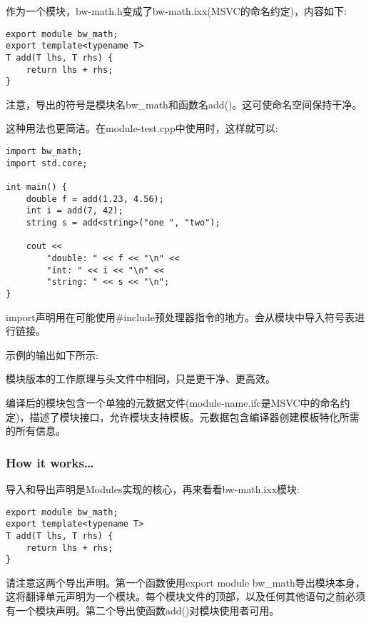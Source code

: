 作为一个模块，bw-math.h变成了bw-math.ixx(MSVC的命名约定)，内容如下:

\begin{lstlisting}[style=styleCXX]
export module bw_math;
export template<typename T>
T add(T lhs, T rhs) {
	return lhs + rhs;
}
\end{lstlisting}

注意，导出的符号是模块名bw\_math和函数名add()。这可使命名空间保持干净。

这种用法也更简洁。在module-test.cpp中使用时，这样就可以:

\begin{lstlisting}[style=styleCXX]
import bw_math;
import std.core;

int main() {
	double f = add(1.23, 4.56);
	int i = add(7, 42);
	string s = add<string>("one ", "two");
	
	cout <<
		"double: " << f << "\n" <<
		"int: " << i << "\n" <<
		"string: " << s << "\n";
}
\end{lstlisting}

import声明用在可能使用\#include预处理器指令的地方。会从模块中导入符号表进行链接。

示例的输出如下所示:


模块版本的工作原理与头文件中相同，只是更干净、更高效。

\begin{tcolorbox}[colback=webgreen!5!white,colframe=webgreen!75!black,title=Note]
编译后的模块包含一个单独的元数据文件(module-name.ifc是MSVC中的命名约定)，描述了模块接口，允许模块支持模板。元数据包含编译器创建模板特化所需的所有信息。
\end{tcolorbox}

\subsubsection{How it works…}

导入和导出声明是Modules实现的核心，再来看看bw-math.ixx模块:

\begin{lstlisting}[style=styleCXX]
export module bw_math;
export template<typename T>
T add(T lhs, T rhs) {
	return lhs + rhs;
}
\end{lstlisting}

请注意这两个导出声明。第一个函数使用export module bw\_math导出模块本身，这将翻译单元声明为一个模块。每个模块文件的顶部，以及任何其他语句之前必须有一个模块声明。第二个导出使函数add()对模块使用者可用。

